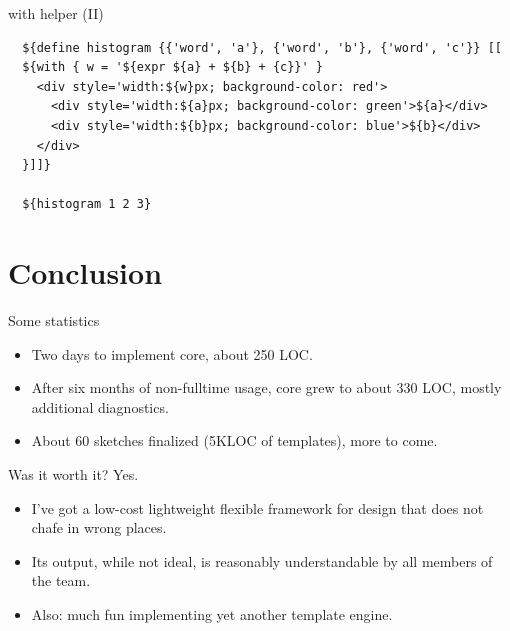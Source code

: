\documentclass[aspectratio=43,handout,bigger]{beamer}
\begin{document}
\begin{frame}[fragile]{with helper (II)}
\begin{verbatim}
  ${define histogram {{'word', 'a'}, {'word', 'b'}, {'word', 'c'}} [[
  ${with { w = '${expr ${a} + ${b} + {c}}' }
    <div style='width:${w}px; background-color: red'>
      <div style='width:${a}px; background-color: green'>${a}</div>
      <div style='width:${b}px; background-color: blue'>${b}</div>
    </div>
  }]]}

  ${histogram 1 2 3}
\end{verbatim}
\end{frame}

\section{Conclusion}

\begin{frame}{Some statistics}
  \begin{itemize}
    \item Two days to implement core, about 250 LOC.
    \item After six months of non-fulltime usage, core grew to about 330 LOC,
          mostly additional diagnostics.
    \item About 60 sketches finalized (5KLOC of templates), more to come.
  \end{itemize}
\end{frame}


\begin{frame}{Was it worth it?}
  Yes.
  \begin{itemize}
    \item I've got a low-cost lightweight flexible framework
          for design that does not chafe in wrong places.
    \item Its output, while not ideal, is reasonably understandable
          by all members of the team.
    \item Also: much fun implementing yet another template engine.
  \end{itemize}
\end{frame}

\end{document}
